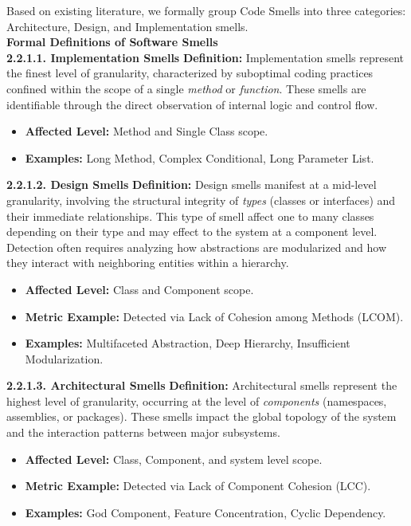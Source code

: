 Based on existing literature, we formally group Code Smells into three categories:
Architecture, Design, and Implementation smells.
\\

\textbf{Formal Definitions of Software Smells}
\\

\textbf{2.2.1.1. Implementation Smells}
\textbf{Definition:} Implementation smells represent the finest level of granularity, characterized by suboptimal coding practices confined within the scope of a single \textit{method} or \textit{function}.
These smells are identifiable through the direct observation of internal logic and control flow.
\begin{itemize}
    \item \textbf{Affected Level:} Method and Single Class scope.
    \item \textbf{Examples:} Long Method, Complex Conditional, Long Parameter List.
\end{itemize}

\vspace{1em}
\textbf{2.2.1.2. Design Smells}
\textbf{Definition:} Design smells manifest at a mid-level granularity, involving the structural integrity of \textit{types} (classes or interfaces) and their immediate relationships.
This type of smell affect one to many classes depending on their type and may effect to the system at a component level.
Detection often requires analyzing how abstractions are modularized and how they interact with neighboring entities within a hierarchy.
\begin{itemize}
    \item \textbf{Affected Level:} Class and Component scope.
    \item \textbf{Metric Example:} Detected via Lack of Cohesion among Methods (LCOM).
    \item \textbf{Examples:} Multifaceted Abstraction, Deep Hierarchy, Insufficient Modularization.
\end{itemize}

\vspace{1em}
\textbf{2.2.1.3. Architectural Smells}
\textbf{Definition:} Architectural smells represent the highest level of granularity, occurring at the level of \textit{components} (namespaces, assemblies, or packages).
These smells impact the global topology of the system and the interaction patterns between major subsystems.
\begin{itemize}
    \item \textbf{Affected Level:} Class, Component, and system level scope.
    \item \textbf{Metric Example:} Detected via Lack of Component Cohesion (LCC).
    \item \textbf{Examples:} God Component, Feature Concentration, Cyclic Dependency.
\end{itemize}

